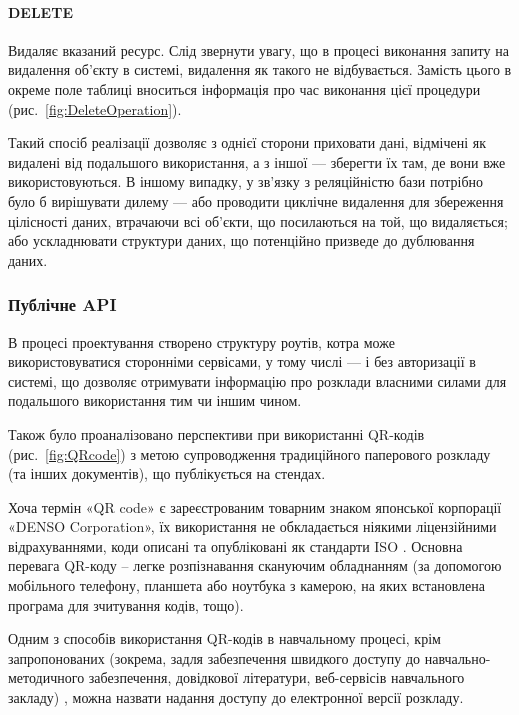 \paragraph{DELETE}

Видаляє вказаний ресурс.
Слід звернути увагу, що в процесі виконання запиту на видалення об’єкту в системі, видалення як такого не відбувається. Замість цього в окреме поле таблиці вноситься інформація про час виконання цієї процедури (рис.~\ref{fig:DeleteOperation}).

Такий спосіб реалізації дозволяє з однієї сторони приховати дані, відмічені як видалені від подальшого використання, а з іншої — зберегти їх там, де вони вже використовуються. В іншому випадку, у зв’язку з реляційністю бази потрібно було б вирішувати дилему — або проводити циклічне видалення для збереження цілісності даних, втрачаючи всі об’єкти, що посилаються на той, що видаляється; або ускладнювати структури даних, що потенційно призведе до дублювання даних.

\subsubsection{Публічне API}

В процесі проектування створено структуру роутів, котра може використовуватися сторонніми сервісами, у тому числі — і без авторизації в системі, що дозволяє отримувати інформацію про розклади власними силами для подальшого використання тим чи іншим чином. 

Також було проаналізовано перспективи при використанні QR-кодів (рис.~\ref{fig:QRcode}) з метою супроводження традиційного паперового розкладу (та інших документів), що публікується на стендах.

Хоча термін «QR code» є зареєстрованим товарним знаком японської корпорації «DENSO Corporation», їх використання не обкладається ніякими ліцензійними відрахуваннями, коди описані та опубліковані як стандарти ISO \cite{воронкін2014можливості}. Основна перевага QR-коду – легке розпізнавання скануючим обладнанням (за допомогою мобільного телефону, планшета або ноутбука з камерою, на яких встановлена програма для зчитування кодів, тощо).

Одним з способів використання QR-кодів в навчальному процесі, крім запропонованих (зокрема, задля забезпечення швидкого доступу до навчально-методичного забезпечення, довідкової літератури, веб-сервісів навчального закладу) \cite[146]{воронкін2014можливості},  можна назвати надання доступу до електронної версії розкладу.
